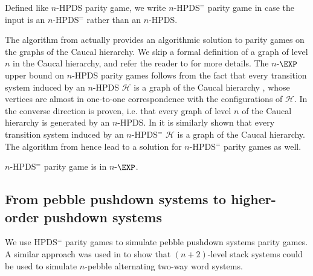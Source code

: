 \documentclass[a4paper,UKenglish,cleveref, autoref, thm-restate]{lipics-v2021}
\renewcommand{\H}{\mathcal{H}}
\begin{document}
Defined like {\sc $n$-HPDS parity game}, we write {\sc $n$-HPDS$^=$ parity game}  
in case the input is an $n$-HPDS$^=$ rather than an $n$-HPDS.



The algorithm from \cite{Cach03} actually provides an algorithmic solution to parity games on the graphs of the Caucal hierarchy. 
We skip a formal definition of a graph of level $n$ in the Caucal hierarchy, and refer the reader
to \cite{Cau02mfcs} for more details.
The $n$-$\EXP$ upper bound on $n$-HPDS parity games follows from the fact that every transition system induced by an $n$-HPDS $\H$ is a graph of the Caucal hierarchy \cite{Cach03, Woeh05},
whose vertices are almost in one-to-one correspondence with the configurations of $\H$.
In \cite{Woeh05} the converse direction is proven, i.e. that every graph of level $n$
of the Caucal hierarchy is generated by an $n$-HPDS.  
%
%
In \cite{carayol2006automates}
it is similarly shown that
every transition system induced by an $n$-HPDS$^=$ $\H$ is a graph of the Caucal hierarchy.
%
%
The algorithm from \cite{Cach03} hence lead to a solution for
$n$-HPDS$^=$ parity games as well.





\begin{theorem}\label{HPDA parity game}
{\sc $n$-HPDS$^=$ parity game} is in $n$-$\EXP$.
\end{theorem}









\subsection{From pebble pushdown 
systems 
to higher-order pushdown 
systems
}



We use HPDS$^=$ parity games to simulate pebble pushdown systems
parity games.
A similar approach was used in \cite{carayol2006automates} to show that $(n + 2)$-level stack
systems could be used to simulate $n$-pebble alternating two-way word systems.
\end{document}
